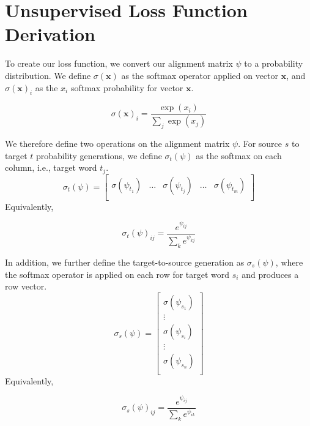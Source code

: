 \documentclass[twoside,twocolumn]{article}
\renewcommand{\vec}[1]{\mathbf{#1}}
\newlength\mystoreparindent
\newenvironment{myparindent}[1]{%
  \setlength{\mystoreparindent}{\the\parindent}
  \setlength{\parindent}{#1}
  }{%
  \setlength{\parindent}{\mystoreparindent}
}
\begin{document}
\clearpage
\appendix
\onecolumn
\begin{myparindent}{0pt}
\section{Unsupervised Loss Function Derivation}
\label{appendix:loss-function}
To create our loss function, we convert our alignment matrix $\psi$ to a
probability distribution. We define $\sigma(\vec{x})$ as the softmax operator
applied on vector $\vec{x}$, and $\sigma(\vec{x})_i$ as the $x_i$ softmax
probability for vector $\vec{x}$.

\begin{equation}
\sigma(\vec{x})_i = \frac{\exp(x_i)}{\sum_j\exp(x_j)}
\end{equation}

We therefore define two operations on the alignment matrix $\psi$. For source
$s$ to target $t$ probability generations, we define $\sigma_t(\psi)$ as the
softmax on each column, i.e., target word $t_j$.
\begin{equation}
  \sigma_t(\psi) = \left[
    \begin{matrix}
      \sigma(\psi_{t_1}) &
      \hdots &
      \sigma(\psi_{t_j}) &
      \hdots &
      \sigma(\psi_{t_m})  \\
    \end{matrix}
\right]
\end{equation}
Equivalently,

\begin{equation}
  \sigma_t(\psi)_{ij} = \frac{e^{\psi_{ij}}}{\sum_{k} e^{\psi_{kj}}}
\end{equation}

In addition, we further define the target-to-source generation as
$\sigma_s(\psi)$, where the softmax operator is applied on each row for target
word $s_i$ and produces a row vector.
\begin{equation}
  \sigma_s(\psi) = \left[
    \begin{matrix}
      \sigma(\psi_{s_1})  \\
      \vdots \\
      \sigma(\psi_{s_i})  \\
      \vdots \\
      \sigma(\psi_{s_n})  \\
    \end{matrix}
\right]
\end{equation}
Equivalently,

\begin{equation}
  \sigma_s(\psi)_{ij} = \frac{e^{\psi_{ij}}}{\sum_{k} e^{\psi_{ik}}}
\end{equation}


\end{myparindent}
\end{document}
